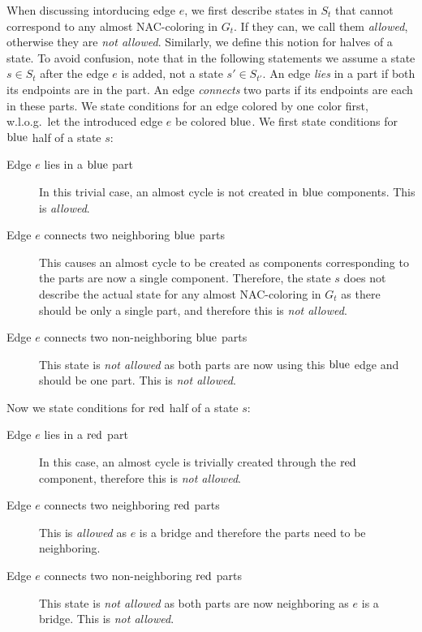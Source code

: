 When discussing \IntroduceEdgeNode{} intorducing edge \( e \),
we first describe states in \( S_{t} \)
that cannot correspond to any almost NAC-coloring in \( G_t \).
If they can, we call them \emph{allowed}, otherwise they are \emph{not allowed}.
Similarly, we define this notion for halves of a state.
To avoid confusion, note that in the following statements we assume
a state \( s \in S_t \) after the edge \( e \) is added, not a state \( s' \in S_{t'} \).
%
An edge \emph{lies} in a part if both its endpoints are in the part.
An edge \emph{connects} two parts if its endpoints are each in these parts.
%
We state conditions for an edge colored by one color first,
w.l.o.g.\ let the introduced edge \( e \) be colored \( \text{blue} \).
We first state conditions for \( \text{blue} \) half of a state \( s \):
%
\begin{description}
	\item[Edge \( e \) lies in a \( \text{blue} \) part]
	      In this trivial case, an almost cycle is not created in \( \text{blue} \) components.
	      This is \emph{allowed}.
	\item[Edge \( e \) connects two neighboring \( \text{blue} \) parts]
	      This causes an almost cycle to be created as
	      components corresponding to the parts
	      are now a single component.
	      Therefore, the state \( s \) does not describe
	      the actual state for any almost NAC-coloring in \( G_t \)
	      as there should be only a single part, and therefore this is \emph{not allowed}.
	\item[Edge \( e \) connects two non-neighboring \( \text{blue} \) parts]
	      This state is \emph{not allowed} as both parts
	      are now using this \( \text{blue} \) edge and should be one part.
	      This is \emph{not allowed}.
\end{description}
%
Now we state conditions for \( \text{red} \) half of a state \( s \):
%
\begin{description}
	\item[Edge \( e \) lies in a \( \text{red} \) part]
	      In this case, an almost cycle is trivially created
	      through the \( \text{red} \) component,
	      therefore this is \emph{not allowed}.
	\item[Edge \( e \) connects two neighboring \( \text{red} \) parts]
	      This is \emph{allowed} as \( e \) is a bridge and
	      therefore the parts need to be neighboring.
	\item[Edge \( e \) connects two non-neighboring \( \text{red} \) parts]
	      This state is \emph{not allowed} as both parts
	      are now neighboring as \( e \) is a bridge.
	      This is \emph{not allowed}.
\end{description}
%

